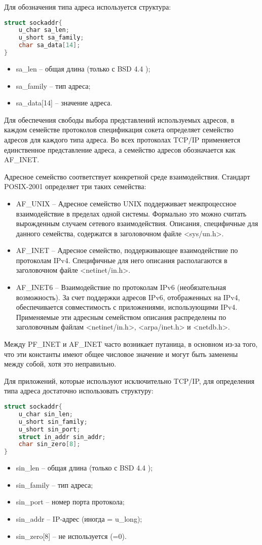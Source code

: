 Для обозначения типа адреса используется структура:

\begin{lstlisting}[language=C]
struct sockaddr{
	u_char sa_len;
	u_short sa_family;
	char sa_data[14];
}
\end{lstlisting}
\begin{itemize}
\item sa\_len -- общая длина (только с BSD 4.4 );
\item sa\_family -- тип адреса;
\item sa\_data[14] -- значение адреса.
\end{itemize}

Для обеспечения свободы выбора представлений используемых адресов,  в каждом семействе протоколов спецификация сокета определяет семейство адресов для каждого типа адреса. Во всех протоколах TCP/IP применяется единственное представление адреса,  а семейство адресов обозначается как AF\_INET.

Адресное семейство соответствует конкретной среде взаимодействия. Стандарт POSIX-2001 определяет три таких семейства:
\begin{itemize}
	\item AF\_UNIX -- Адресное семейство UNIX поддерживает межпроцессное взаимодействие в пределах одной системы. Формально это можно считать вырожденным случаем сетевого взаимодействия. Описания, специфичные для данного семейства, содержатся в заголовочном файле <sys/un.h>. 
	\item AF\_INET -- Адресное семейство, поддерживающее взаимодействие по протоколам IPv4. 
		Специфичные для него описания располагаются в заголовочном файле <netinet/in.h>. 
	\item AF\_INET6 -- Взаимодействие по протоколам IPv6 (необязательная возможность). 
		За счет поддержки адресов IPv6, отображенных на IPv4, обеспечивается совместимость с приложениями, 
		использующими IPv4. Применяемые эти адресным семейством описания распределены по заголовочным 
		файлам <netinet/in.h>, <arpa/inet.h> и <netdb.h>. 
\end{itemize}

Между PF\_INET и AF\_INET часто возникает путаница,  в основном из-за того,  что эти константы имеют общее числовое значение и могут быть заменены между собой,  хотя это неправильно.

Для приложений,  которые используют исключительно TCP/IP,  для определения типа адреса достаточно использовать структуру:
\begin{lstlisting}[language=C]
struct sockaddr{
	u_char sin_len;
	u_short sin_family;
	u_short sin_port;
	struct in_addr sin_addr;
	char sin_zero[8];
}
\end{lstlisting}
\begin{itemize}
	\item sin\_len -- общая длина (только с BSD 4.4 );
	\item sin\_family -- тип адреса;
	\item sin\_port -- номер порта протокола;
	\item sin\_addr -- IP-адрес (иногда = u\_long);
	\item sin\_zero[8] -- не используется (=0).
\end{itemize}

